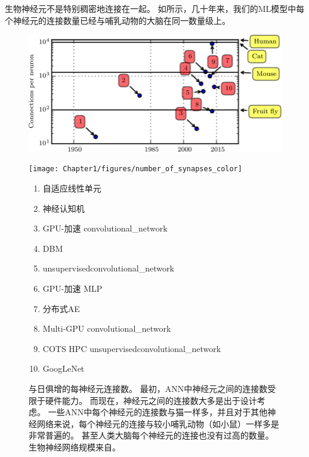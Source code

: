 生物神经元不是特别稠密地连接在一起。
如所示，几十年来，我们的\gls{ML}模型中每个神经元的连接数量已经与哺乳动物的大脑在同一数量级上。

\begin{figure}[!htb]
\ifOpenSource
\centerline{\includegraphics[scale=0.5]{images/10.png}}
\else
\centerline{\texttt{[image: Chapter1/figures/number\_of\_synapses\_color]}}
\fi
\caption{与日俱增的每神经元连接数。 %
最初，\gls{ANN}中神经元之间的连接数受限于硬件能力。
而现在，神经元之间的连接数大多是出于设计考虑。
一些\gls{ANN}中每个神经元的连接数与猫一样多，并且对于其他神经网络来说，每个神经元的连接与较小哺乳动物（如小鼠）一样多是非常普遍的。
甚至人类大脑每个神经元的连接也没有过高的数量。
生物神经网络规模来自\citet{number_of_neurons}。
}
\label{fig:chap1_number_of_synapses_color}
{\tiny
\begin{enumerate}
  \itemsep0em
  \item %
    自适应线性单元~\citep{Widrow60}
  \item %
    神经认知机~\citep{Fukushima80}
  \item %
    GPU-加速 \gls{convolutional_network}~\citep{chellapilla:inria-00112631}
  \item %
    \gls{DBM}~\citep{SalHinton09}
  \item %
    \gls{unsupervised}\gls{convolutional_network}~\citep{Jarrett-ICCV2009}
  \item %
    GPU-加速 \gls{MLP}~\citep{Ciresan-2010}
  \item %
    分布式\gls{AE}~\citep{QuocLe-ICML2012}
  \item %
    Multi-GPU \gls{convolutional_network}~\citep{Krizhevsky-2012}
  \item %
    COTS HPC  \gls{unsupervised}\gls{convolutional_network}~\citep{icml2013_coates13}
  \item %
    GoogLeNet~\citep{Szegedy-et-al-arxiv2014}
\end{enumerate}
} %
\end{figure}

